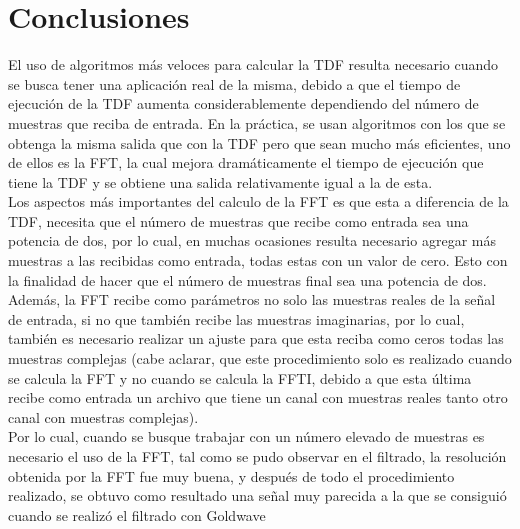\section{Conclusiones}
El uso de algoritmos más veloces para calcular la TDF resulta necesario cuando se busca tener una aplicación real de la misma, debido a que el tiempo de ejecución de la TDF aumenta considerablemente dependiendo del número de muestras que reciba de entrada. En la práctica, se usan algoritmos con los que se obtenga la misma salida que con la TDF pero que sean mucho más eficientes, uno de ellos es la FFT, la cual mejora dramáticamente el tiempo de ejecución que tiene la TDF y se obtiene una salida relativamente igual a la de esta.\\ Los aspectos más importantes del calculo de la FFT es que esta a diferencia de la TDF, necesita que el número de muestras que recibe como entrada sea una potencia de dos, por lo cual, en muchas ocasiones resulta necesario agregar más muestras a las recibidas como entrada, todas estas con un valor de cero. Esto con la finalidad de hacer que el número de muestras final sea una potencia de dos. Además, la FFT recibe como parámetros no solo las muestras reales de la señal de entrada, si no que también recibe las muestras imaginarias, por lo cual, también es necesario realizar un ajuste para que esta reciba como ceros todas las muestras complejas (cabe aclarar, que este procedimiento solo es realizado cuando se calcula la FFT y no cuando se calcula la FFTI, debido a que esta última recibe como entrada un archivo que tiene un canal con muestras reales tanto otro canal con muestras complejas).\\ Por lo cual, cuando se busque trabajar con un número elevado de muestras es necesario el uso de la FFT, tal como se pudo observar en el filtrado, la resolución obtenida por la FFT fue muy buena, y después de todo el procedimiento realizado, se obtuvo como resultado una señal muy parecida a la que se consiguió cuando se realizó el filtrado con Goldwave